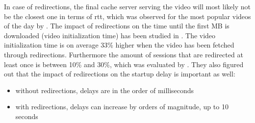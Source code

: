 In case of redirections, the final cache server serving the video will most likely not be the closest one in terms of \gls{rtt}, which was observed for the most popular videos of the day by \cite{inp:network_characteristics}. The impact of redirections on the time until the first MB is downloaded (video initialization time) has been studied in \cite{inpr:vivisecting_youtube}. The video initialization time is on average 33\% higher when the video has been fetched through redirections. Furthermore the amount of sessions that are redirected at least once is between 10\% and 30\%, which was evaluated by \cite{inpr:youtube_everywhere}. They also figured out that the impact of redirections on the startup delay is important as well:

\begin{itemize}
  \item without redirections, delays are in the order of milliseconds
  \item with redirections, delays can increase by orders of magnitude, up to 10 seconds
\end{itemize}

